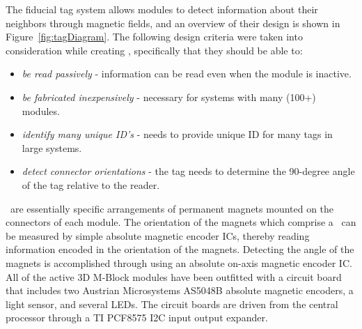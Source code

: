 The \TagNamePlural fiducial tag system allows modules to detect information about their neighbors through magnetic fields, and an overview of their design is shown in Figure~\ref{fig:tagDiagram}. The following design criteria were taken into consideration while creating \TagNamePlural, specifically that they should be able to:
\begin{itemize}
	\item \emph{be read passively} - information can be read even when the module is inactive.
	\item \emph{be fabricated inexpensively} - necessary for systems with many (100+) modules.
	\item \emph{identify many unique ID's} - needs to provide unique ID for many tags in large systems.
	\item \emph{detect connector orientations} - the tag needs to determine the 90-degree angle of the tag relative to the reader.
\end{itemize} 

\TagNamePlural~are essentially specific arrangements of permanent magnets mounted on the connectors of each module.  The orientation of the magnets which comprise a \tagName~can be measured by simple absolute magnetic encoder ICs, thereby reading information encoded in the orientation of the magnets. Detecting the angle of the magnets is accomplished through using an absolute on-axis magnetic encoder IC. All of the active 3D M-Block modules have been outfitted with a circuit board that includes two Austrian Microsystems AS5048B absolute magnetic encoders, a light sensor, and several LEDs. The circuit boards are driven from the central processor through a TI PCF8575 I2C input output expander.

